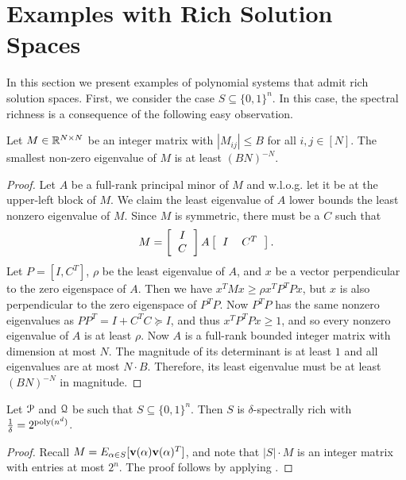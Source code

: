 \section{Examples with Rich Solution Spaces}
\label{sec:nicespaces}
In this section we present examples of polynomial systems that admit rich solution spaces. First, we consider the case $S \subseteq \{0,1\}^n$. In this case, the spectral richness is a consequence of the following easy observation.
\begin{lemma} \label{lem:integer}
	Let $M \in \mathbb R^{N \times N}$ be an integer matrix with $|M_{ij}| \leq B$ for all $i,j \in [N]$.  The smallest non-zero eigenvalue of $M$ is at least 
	$(BN)^{-N}$.
\end{lemma}
\begin{proof}
Let $A$ be a full-rank principal minor of $M$ and w.l.o.g. let it be at the upper-left block of $M$. We claim the least eigenvalue of $A$ lower bounds the least nonzero eigenvalue of $M$.
%
Since $M$ is symmetric, there must be a $C$ such that
\[M = \left[\begin{tabular}{c} $I$ \\ $C$\end{tabular}\right]A\left[\begin{tabular}{cc} $I$ & $C^T$\end{tabular}\right].\]
Let $P = [I, C^T]$, $\rho$ be the least eigenvalue of $A$, and $x$ be a vector perpendicular to the zero eigenspace of $A$. Then we have $x^TMx \geq \rho x^TP^TPx$,
but $x$ is also perpendicular to the zero eigenspace of $P^TP$. Now $P^TP$ has the same nonzero eigenvalues as $PP^T = I + C^TC \succeq I$, and thus $x^TP^TPx \geq 1$, and so every nonzero eigenvalue of $A$ is at least $\rho$. Now $A$ is a full-rank bounded integer matrix with dimension at most $N$. The magnitude of its determinant is at least $1$ and all eigenvalues are at most $N \cdot B$.  Therefore, its least eigenvalue must be at least $(BN)^{-N}$ in magnitude. 
\end{proof}


\begin{lemma}\label{lem:integer-rich}
Let $\mathcal P$ and $\mathcal Q$ be such that $S \subseteq \{0,1\}^n$. Then $S$ is $\delta$-spectrally rich with $\frac{1}{\delta} = 2^{\operatorname{poly}(n^d)}$.
\end{lemma}
\begin{proof}
	Recall $M = E_{\alpha \in S}[{\bf v}(\alpha){\bf v}(\alpha)^T]$, and note that $|S| \cdot M$ is an integer matrix with entries at most $2^n$.  The proof follows by applying . 
\end{proof}

